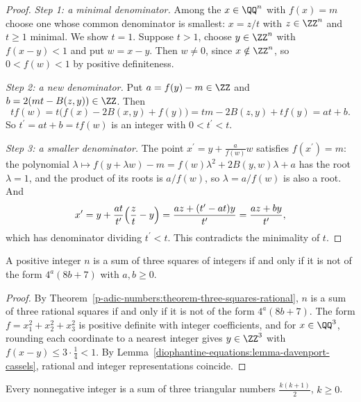 \begin{proof}
\emph{Step 1: a minimal denominator.} Among the $x \in \QQ^n$ with $f(x) = m$ choose one whose common denominator is smallest: $x = z/t$ with $z \in \ZZ^n$ and $t \geq 1$ minimal. We show $t = 1$. Suppose
$t > 1$, choose $y \in \ZZ^n$ with $f(x - y) < 1$ and put $w = x - y$. Then $w \neq 0$, since $x \notin \ZZ^n$, so $0 < f(w) < 1$ by positive definiteness.

\emph{Step 2: a new denominator.} Put $a = f(y) - m \in \ZZ$ and $b = 2(mt - B(z, y)) \in \ZZ$. Then
\[
tf(w) = t\bigl(f(x) - 2B(x, y) + f(y)\bigr) = tm - 2B(z, y) + tf(y) = at + b.
\]
So $t^{\prime} = at + b = tf(w)$ is an integer with $0 < t^{\prime} < t$.

\emph{Step 3: a smaller denominator.} The point $x^{\prime} = y + \frac{a}{f(w)}w$ satisfies $f(x^{\prime}) = m$: the polynomial $\lambda \mapsto f(y + \lambda w) - m = f(w)\lambda^2 + 2B(y, w)\lambda + a$ has
the root $\lambda = 1$, and the product of its roots is $a/f(w)$, so $\lambda = a/f(w)$ is also a root. And
\[
x^{\prime} = y + \frac{at}{t^{\prime}}\Bigl(\frac zt - y\Bigr) = \frac{az + (t^{\prime} - at)y}{t^{\prime}} = \frac{az + by}{t^{\prime}},
\]
which has denominator dividing $t^{\prime} < t$. This contradicts the minimality of $t$.
\end{proof}

\begin{theorem}\label{diophantine-equations:theorem-three-squares}
A positive integer $n$ is a sum of three squares of integers if and only if it is not of the form $4^a(8b + 7)$ with $a, b \geq 0$.
\end{theorem}

\begin{proof}
By Theorem~\ref{p-adic-numbers:theorem-three-squares-rational}, $n$ is a sum of three rational squares if and only if it is not of the form $4^a(8b + 7)$. The form $f = x_1^2 + x_2^2 + x_3^2$ is positive definite
with integer coefficients, and for $x \in \QQ^3$, rounding each coordinate to a nearest integer gives $y \in \ZZ^3$ with $f(x - y) \leq 3 \cdot \frac14 < 1$. By
Lemma~\ref{diophantine-equations:lemma-davenport-cassels}, rational and integer representations coincide.
\end{proof}

\begin{corollary}[Gauss]\label{diophantine-equations:corollary-triangular}
Every nonnegative integer is a sum of three triangular numbers $\frac{k(k + 1)}{2}$, $k \geq 0$.
\end{corollary}

